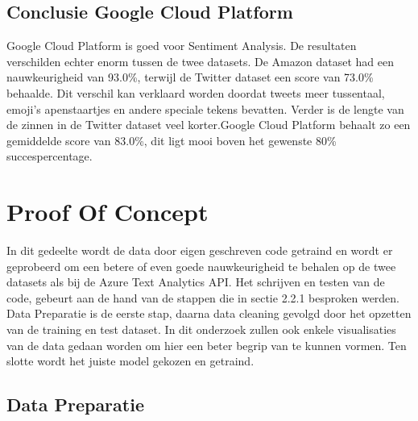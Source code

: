 \subsection{Conclusie Google Cloud Platform}
\label{conclusieGoogleCloudPlatform}

Google Cloud Platform is goed voor Sentiment Analysis. De resultaten verschilden echter enorm tussen de twee datasets. De Amazon dataset had een nauwkeurigheid van 93.0\%, terwijl de Twitter dataset een score van 73.0\% behaalde. Dit verschil kan verklaard worden doordat tweets meer tussentaal, emoji's apenstaartjes en andere speciale tekens bevatten. Verder is de lengte van de zinnen in de Twitter dataset veel korter.Google Cloud Platform behaalt zo een gemiddelde score van 83.0\%, dit ligt mooi boven het gewenste 80\% succespercentage.


\section{Proof Of Concept}

In dit gedeelte wordt de data door eigen geschreven code getraind en wordt er geprobeerd om een betere of even goede nauwkeurigheid te behalen op de twee datasets als bij de Azure Text Analytics API. Het schrijven en testen van de code, gebeurt aan de hand van de stappen die in sectie 2.2.1 besproken werden. Data Preparatie is de eerste stap, daarna data cleaning gevolgd door het opzetten van de training en test dataset. In dit onderzoek zullen ook enkele visualisaties van de data gedaan worden om hier een beter begrip van te kunnen vormen. Ten slotte wordt het juiste model gekozen en getraind. 

\subsection{Data Preparatie}
\label{proofofconceptdatapreparatie}


